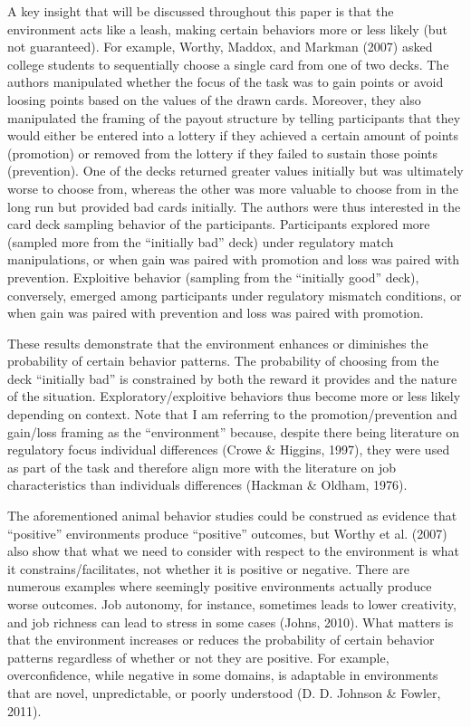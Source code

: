 \documentclass[english,man]{apa6}
\newcounter{author}
\theoremstyle{definition}
\theoremstyle{definition}
\theoremstyle{definition}
\theoremstyle{remark}
\begin{document}
A key insight that will be discussed throughout this paper is that the
environment acts like a leash, making certain behaviors more or less
likely (but not guaranteed). For example, Worthy, Maddox, and Markman
(2007) asked college students to sequentially choose a single card from
one of two decks. The authors manipulated whether the focus of the task
was to gain points or avoid loosing points based on the values of the
drawn cards. Moreover, they also manipulated the framing of the payout
structure by telling participants that they would either be entered into
a lottery if they achieved a certain amount of points (promotion) or
removed from the lottery if they failed to sustain those points
(prevention). One of the decks returned greater values initially but was
ultimately worse to choose from, whereas the other was more valuable to
choose from in the long run but provided bad cards initially. The
authors were thus interested in the card deck sampling behavior of the
participants. Participants explored more (sampled more from the
\enquote{initially bad} deck) under regulatory match manipulations, or
when gain was paired with promotion and loss was paired with prevention.
Exploitive behavior (sampling from the \enquote{initially good} deck),
conversely, emerged among participants under regulatory mismatch
conditions, or when gain was paired with prevention and loss was paired
with promotion.

These results demonstrate that the environment enhances or diminishes
the probability of certain behavior patterns. The probability of
choosing from the deck \enquote{initially bad} is constrained by both
the reward it provides and the nature of the situation.
Exploratory/exploitive behaviors thus become more or less likely
depending on context. Note that I am referring to the
promotion/prevention and gain/loss framing as the \enquote{environment}
because, despite there being literature on regulatory focus individual
differences (Crowe \& Higgins, 1997), they were used as part of the task
and therefore align more with the literature on job characteristics than
individuals differences (Hackman \& Oldham, 1976).

The aforementioned animal behavior studies could be construed as
evidence that \enquote{positive} environments produce \enquote{positive}
outcomes, but Worthy et al. (2007) also show that what we need to
consider with respect to the environment is what it
constrains/facilitates, not whether it is positive or negative. There
are numerous examples where seemingly positive environments actually
produce worse outcomes. Job autonomy, for instance, sometimes leads to
lower creativity, and job richness can lead to stress in some cases
(Johns, 2010). What matters is that the environment increases or reduces
the probability of certain behavior patterns regardless of whether or
not they are positive. For example, overconfidence, while negative in
some domains, is adaptable in environments that are novel,
unpredictable, or poorly understood (D. D. Johnson \& Fowler, 2011).
\end{document}
